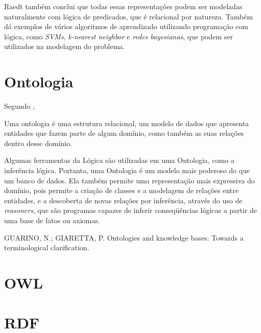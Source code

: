 Raedt também conclui que todas essas representações podem ser modeladas naturalmente com lógica de predicados, que é relacional por natureza. Também dá exemplos de vários algoritmos de aprendizado utilizando programação com lógica,
como \textit{SVMs}, \textit{k-nearest neighbor} e \textit{redes bayesianas}, que podem ser utilizados na modelagem do problema.

\section{Ontologia}
\label{sec:ontologia}


Segundo \citet{Guarino2009},

Uma ontologia é uma estrutura relacional, um modelo de dados que apresenta entidades que fazem parte de algum domínio, como também as suas relações dentro desse domínio.

Algumas ferramentas da Lógica são utilizadas em uma Ontologia, como a inferência lógica. Portanto, uma Ontologia é um modelo mais poderoso do que um banco de dados. Ela também permite uma representação mais expressiva do domínio, pois permite a criação de classes e a modelagem de relações entre entidades, e a descoberta de novas relações por inferência, através do uso de \textit{reasoners}, que são programas capazes de inferir conseqüências lógicas a partir de uma base de fatos ou axiomas.


GUARINO, N.; GIARETTA, P. Ontologies and knowledge bases: Towards a terminological clarification.


\section{OWL}
\label{sec:owl}


\section{RDF}
\label{sec:rdf}
